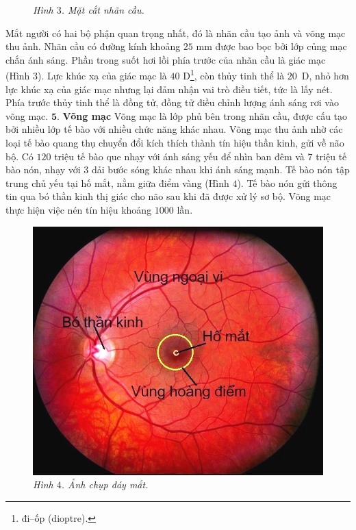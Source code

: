 \begin{multicols}{2}
\begin{figure}[H]
		\caption{\small\textit{\color{timhieukhoahoc}Hình $3$. Mặt cắt nhãn cầu.}}
		\vspace*{-10pt}
	\end{figure}
	Mắt người có hai bộ phận quan trọng nhất, đó là nhãn cầu tạo ảnh và võng mạc thu ảnh. Nhãn cầu có đường kính khoảng $25$ mm được bao bọc bởi lớp củng mạc chắn ánh sáng. Phần trong suốt hơi lồi phía trước của nhãn cầu là giác mạc (Hình $3$). Lực khúc xạ của giác mạc là $40$ D\footnote[3]{\color{timhieukhoahoc}đi--ốp (dioptre).}, còn thủy tinh thể là $20$~D, nhỏ hơn lực khúc xạ của giác mạc nhưng lại đảm nhận vai trò điều tiết, tức là lấy nét. Phía trước thủy tinh thể là đồng tử, đồng tử điều chỉnh lượng ánh sáng rơi vào võng mạc.
	\vskip 0.1cm
	$\pmb{5.}$ \textbf{\color{timhieukhoahoc}Võng mạc}
	\vskip 0.1cm
	Võng mạc là lớp phủ bên trong nhãn cầu, được cấu tạo bởi nhiều lớp tế bào với nhiều chức năng khác nhau. Võng mạc thu ảnh nhờ các loại tế bào quang thụ chuyển đổi kích thích thành tín hiệu thần kinh, gửi về não bộ. Có $120$ triệu tế bào que nhạy với ánh sáng yếu để nhìn ban đêm và $7$ triệu tế bào nón, nhạy với $3$ dải bước sóng khác nhau khi ánh sáng mạnh. Tế bào nón tập trung chủ yếu tại hố mắt, nằm giữa điểm vàng (Hình $4$). Tế bào nón gửi thông tin qua bó thần kinh thị giác cho não sau khi đã được xử lý sơ bộ. Võng mạc thực hiện việc nén tín hiệu khoảng $1000$ lần.
	\begin{figure}[H]
		\vspace*{-5pt}
		\centering
		\captionsetup{labelformat= empty, justification=centering}
		\includegraphics[width= 0.75\linewidth]{4}
		\caption{\small\textit{\color{timhieukhoahoc}Hình $4$. Ảnh chụp đáy mắt.}}
		\vspace*{-10pt}
	\end{figure}

\end{multicols}
